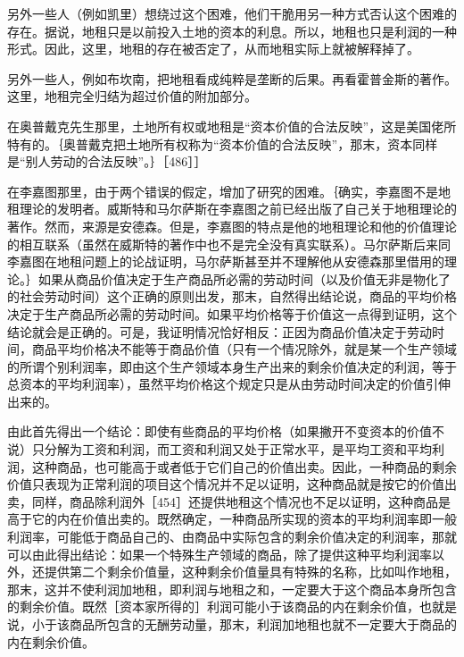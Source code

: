 另外一些人（例如凯里）想绕过这个困难，他们干脆用另一种方式否认这个困难的存在。据说，地租只是以前投入土地的资本的利息。所以，地租也只是利润的一种形式。因此，这里，地租的存在被否定了，从而地租实际上就被解释掉了。

另外一些人，例如布坎南，把地租看成纯粹是垄断的后果。再看霍普金斯的著作。这里，地租完全归结为超过价值的附加部分。

在奥普戴克先生那里，土地所有权或地租是“资本价值的合法反映”，这是美国佬所特有的。｛奥普戴克把土地所有权称为“资本价值的合法反映”，那末，资本同样是“别人劳动的合法反映”。｝［486］］

在李嘉图那里，由于两个错误的假定，增加了研究的困难。｛确实，李嘉图不是地租理论的发明者。威斯特和马尔萨斯在李嘉图之前已经出版了自己关于地租理论的著作。然而，来源是安德森。但是，李嘉图的特点是他的地租理论和他的价值理论的相互联系（虽然在威斯特的著作中也不是完全没有真实联系）。马尔萨斯后来同李嘉图在地租问题上的论战证明，马尔萨斯甚至并不理解他从安德森那里借用的理论。｝如果从商品价值决定于生产商品所必需的劳动时间（以及价值无非是物化了的社会劳动时间）这个正确的原则出发，那末，自然得出结论说，商品的平均价格决定于生产商品所必需的劳动时间。如果平均价格等于价值这一点得到证明，这个结论就会是正确的。可是，我证明情况恰好相反：正因为商品价值决定于劳动时间，商品平均价格决不能等于商品价值（只有一个情况除外，就是某一个生产领域的所谓个别利润率，即由这个生产领域本身生产出来的剩余价值决定的利润，等于总资本的平均利润率），虽然平均价格这个规定只是从由劳动时间决定的价值引伸出来的。

由此首先得出一个结论：即使有些商品的平均价格（如果撇开不变资本的价值不说）只分解为工资和利润，而工资和利润又处于正常水平，是平均工资和平均利润，这种商品，也可能高于或者低于它们自己的价值出卖。因此，一种商品的剩余价值只表现为正常利润的项目这个情况并不足以证明，这种商品就是按它的价值出卖，同样，商品除利润外［454］还提供地租这个情况也不足以证明，这种商品是高于它的内在价值出卖的。既然确定，一种商品所实现的资本的平均利润率即一般利润率，可能低于商品自己的、由商品中实际包含的剩余价值决定的利润率，那就可以由此得出结论：如果一个特殊生产领域的商品，除了提供这种平均利润率以外，还提供第二个剩余价值量，这种剩余价值量具有特殊的名称，比如叫作地租，那末，这并不使利润加地租，即利润与地租之和，一定要大于这个商品本身所包含的剩余价值。既然［资本家所得的］利润可能小于该商品的内在剩余价值，也就是说，小于该商品所包含的无酬劳动量，那末，利润加地租也就不一定要大于商品的内在剩余价值。

